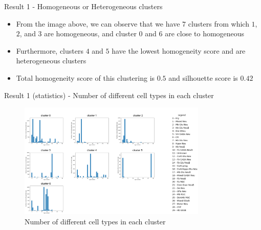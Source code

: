 \documentclass{beamer}
\begin{document}
\begin{frame}{Result 1  - Homogeneous or Heterogeneous clusters}

\begin{itemize}
    \item<1-> From the image above, we can observe that we have $7$ clusters from which $1$, $2$, and $3$ are homogeneous, and cluster $0$ and $6$ are close to homogeneous
    \item<2-> Furthermore, clusters $4$ and $5$ have the lowest homogeneity score and are heterogeneous clusters
    \item<3-> Total homogeneity score of this clustering is $0.5$ and silhouette score is $0.42$
\end{itemize}

\end{frame}
\begin{frame}{Result 1 (statistics) - Number of different cell types in each cluster}

\begin{figure}
    \centering
    \includegraphics[width=0.8\textwidth]{type_num_clusters2.png}
    \caption{Number of different cell types in each cluster}
\end{figure} 

\end{frame}
\end{document}
